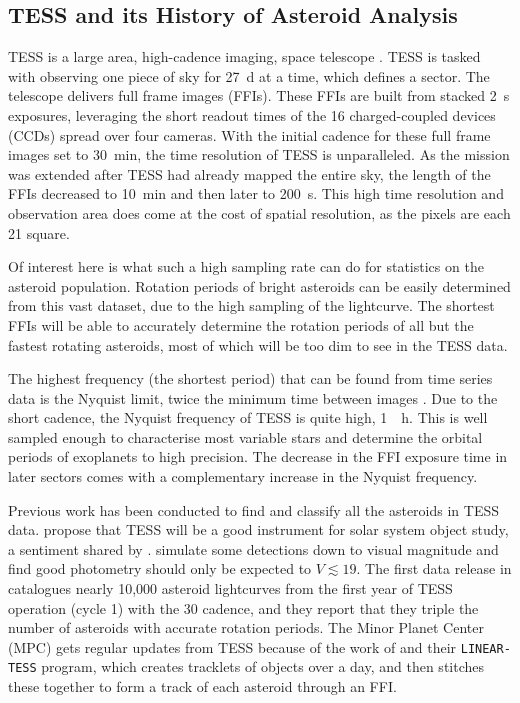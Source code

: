 \documentclass{UCreport}
\begin{document}
\subsection{TESS and its History of Asteroid Analysis}\label{SubSec:TESS}

TESS is a large area, high-cadence imaging, space telescope  \citep{Ricker2014}.
TESS is tasked with observing one piece of sky for \qty{27}{\day} at a time, which defines a sector.
The telescope delivers  full frame images (FFIs).
These FFIs are built from stacked \qty{2}{\second} exposures, leveraging the short readout times of the 16 charged-coupled devices (CCDs) spread over four cameras.
With the initial cadence for these full frame images set to \qty{30}{\minute}, the time resolution of TESS is unparalleled.
As the mission was extended after TESS had already mapped the entire sky, the length of the FFIs decreased to \qty{10}{\minute} and then later to \qty{200}{\second}.
This high time resolution and observation area does come at the cost of spatial resolution, as the pixels are each \qty{21}{\arcsec} square.

Of interest here is what such a high sampling rate can do for statistics on the asteroid population.
Rotation periods of bright asteroids can be easily determined from this vast dataset, due to the high sampling of the lightcurve.
The shortest FFIs will be able to accurately determine the rotation periods of all but the fastest rotating asteroids, most of which will be too dim to see in the TESS data.

The highest frequency (the shortest period) that can be found from time series data is the Nyquist limit, twice the minimum time between images \citep{VanderPlas2018}. 
Due to the short cadence, the Nyquist frequency of TESS is quite high, \qty{1}{\per\hour}.
This is well sampled enough to characterise most variable stars and determine the orbital periods of exoplanets to high precision.
The decrease in the FFI exposure time in later sectors comes with a complementary increase in the Nyquist frequency.

Previous work has been conducted to find and classify all the asteroids in TESS data.
\citet{Pal2018} propose that TESS will be a good instrument for solar system object study, a sentiment shared by \citet{Wong2019}.
\citeauthor{Pal2018} simulate some detections down to  visual magnitude and find good photometry should only be expected to $V \lesssim 19$.
The first data release in \citet{Pal2020} catalogues nearly 10,000 asteroid lightcurves from the first year of TESS operation (cycle 1) with the \qty{30}{\min} cadence, and they report that they triple the number of asteroids with accurate rotation periods.
The Minor Planet Center (MPC) gets regular updates from TESS because of the work of \citet{Woods2021} and their \texttt{LINEAR-TESS} program, which creates tracklets of objects over a day, and then stitches these together to form a track of each asteroid through an FFI.
\end{document}
